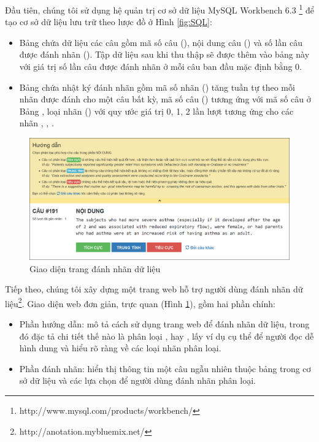 Đầu tiên, chúng tôi sử dụng hệ quản trị cơ sở dữ liệu MySQL Workbench 6.3 \footnote{http://www.mysql.com/products/workbench/} để tạo cơ sở dữ liệu lưu trữ theo lược đồ ở Hình \ref{fig:SQL}:
\begin{itemize}
\item Bảng  chứa dữ liệu các câu gồm mã số câu (), nội dung câu () và số lần câu được đánh nhãn (). Tập dữ liệu sau khi thu thập sẽ được thêm vào bảng này với giá trị số lần câu được đánh nhãn ở mỗi câu ban đầu mặc định bằng 0.
\item Bảng  chứa nhật ký đánh nhãn gồm mã số nhãn () tăng tuần tự theo mỗi nhãn được đánh cho một câu bất kỳ, mã số câu () tương ứng với mã số câu ở Bảng , loại nhãn () với quy ước giá trị 0, 1, 2 lần lượt tương ứng cho các nhãn \tieucuc, \trungtinh, \tichcuc.
\end{itemize}

\begin{figure}[H]
\centering
\includegraphics[scale=0.45]{../hinh/Webpage.png}
\caption{Giao diện trang đánh nhãn dữ liệu}
\label{fig:web}
\end{figure}

Tiếp theo, chúng tôi xây dựng một trang web hỗ trợ người dùng đánh nhãn dữ liệu\footnote{http://anotation.mybluemix.net/}. Giao diện web đơn giản, trực quan (Hình \ref{fig:web}), gồm hai phần chính:
\begin{itemize}
\item Phần hướng dẫn: mô tả cách sử dụng trang web để đánh nhãn dữ liệu, trong đó đặc tả chi tiết thế nào là phân loại \tichcuc, \tieucuc hay \trungtinh, lấy ví dụ cụ thể để người đọc dễ hình dung và hiểu rõ ràng về các loại nhãn phân loại.
\item Phần đánh nhãn: hiển thị thông tin một câu ngẫu nhiên thuộc bảng  trong cơ sở dữ liệu và các lựa chọn để người dùng đánh nhãn phân loại. 
\end{itemize}

